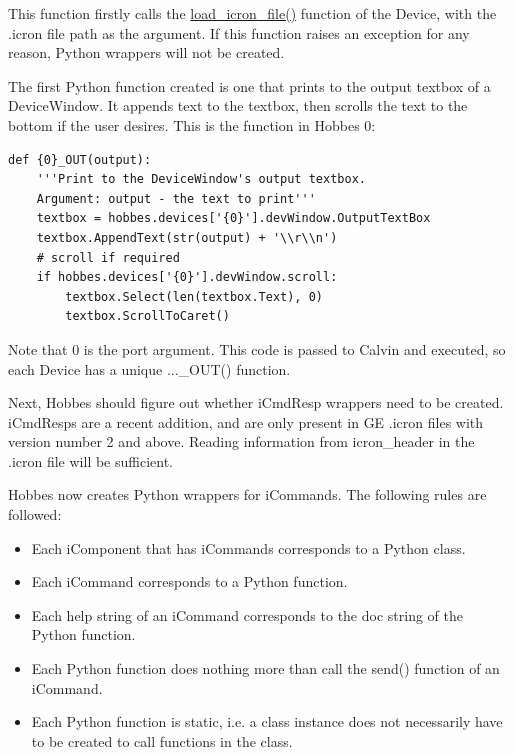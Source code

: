 \documentclass[12pt,letterpaper]{article}
\begin{document}
This function firstly calls the \hyperref[4.3.1.2.5]{load\_icron\_file()} function of the Device, with the .icron file path as the argument.
If this function raises an exception for any reason, Python wrappers will not be created.

The first Python function created is one that prints to the output textbox of a DeviceWindow. It appends text to the textbox, then scrolls the text to the bottom if the user desires. This is the function in Hobbes 0:

\selectfont

\begin{lstlisting}
def {0}_OUT(output):
    '''Print to the DeviceWindow's output textbox.
    Argument: output - the text to print'''
    textbox = hobbes.devices['{0}'].devWindow.OutputTextBox
    textbox.AppendText(str(output) + '\\r\\n')
    # scroll if required
    if hobbes.devices['{0}'].devWindow.scroll:
        textbox.Select(len(textbox.Text), 0)
        textbox.ScrollToCaret()
\end{lstlisting}

\selectfont

Note that {0} is the port argument. This code is passed to Calvin and executed, so each Device has a unique ...\_OUT() function.

Next, Hobbes should figure out whether iCmdResp wrappers need to be created. iCmdResps are a recent addition, and are only present in GE .icron files with version number 2 and above. Reading information from icron\_header in the .icron file will be sufficient.

Hobbes now creates Python wrappers for iCommands. The following rules are followed:

\begin{itemize}

\item Each iComponent that has iCommands corresponds to a Python class.

\item Each iCommand corresponds to a Python function.

\item Each help string of an iCommand corresponds to the doc string of the Python function.

\item Each Python function does nothing more than call the send() function of an iCommand.

\item Each Python function is static, i.e. a class instance does not necessarily have to be created to call functions in the class.

\end{itemize}
\end{document}
